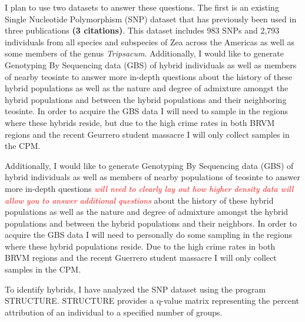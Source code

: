 \documentclass[12pt]{amsart}
\newcommand{\mbh}[1]{\textcolor{red}{ \emph{\scriptsize  #1}} }
\begin{document}
I plan to use two datasets to answer these questions.  
The first is an existing Single Nucleotide Polymorphism (SNP) dataset that has previously been used in three publications \textbf{(3 citations)}.  
This dataset includes 983 SNPs and 2,793 individuals from all species and subspecies of Zea across the Americas as well as some members of the genus \emph{Tripsacum}.  
Additionally, I would like to generate Genotyping By Sequencing data (GBS) of hybrid individuals as well as members of nearby teosinte to answer more in-depth questions about the history of these hybrid populations as well as the nature and degree of admixture amongst the hybrid populations and between the hybrid populations and their neighboring teosinte.  
In order to acquire the GBS data I will need to sample in the regions where these hybrids reside, but due to the high crime rates in both BRVM regions and the recent Geurrero student massacre I will only collect samples in the CPM.%

Additionally, I would like to generate Genotyping By Sequencing data (GBS) of hybrid individuals as well as members of nearby populations of teosinte to answer more in-depth questions \mbh{will need to clearly lay out how higher density data will allow you to answer additional questions} about the history of these hybrid populations as well as the nature and degree of admixture amongst the hybrid populations and between the hybrid populations and their neighbors.  
In order to acquire the GBS data I will need to personally do some sampling in the regions where these hybrid populations reside.  
Due to the high crime rates in both BRVM regions and the recent Guerrero student massacre I will only collect samples in the CPM.%


To identify hybrids, I have analyzed the SNP dataset using the program STRUCTURE.  STRUCTURE provides a q-value matrix representing the percent attribution of an individual to a specified number of groups.  
\end{document}
